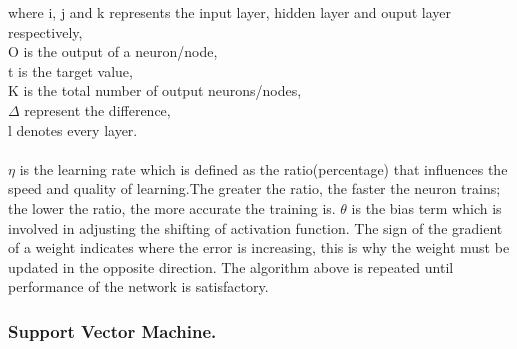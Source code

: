 where i, j and k represents the input layer, hidden layer and ouput layer respectively,\\
O is the output of a neuron/node,\\
t is the target value,\\
K is the total number of output neurons/nodes,\\
$\Delta$ represent the difference,\\
l denotes every layer.\\
\\
$\eta$ is the learning rate which is defined as the ratio(percentage) that influences the speed and quality of learning.The greater the ratio, the faster the neuron trains;
the lower the ratio, the more accurate the training is. $\theta$ is the bias term which is involved in adjusting the shifting of activation function. The sign of the gradient
of a weight indicates where the error is increasing, this is why the weight must be updated in the opposite direction. The algorithm above is
repeated until performance of the network is satisfactory.

\subsubsection{Support Vector Machine.}

